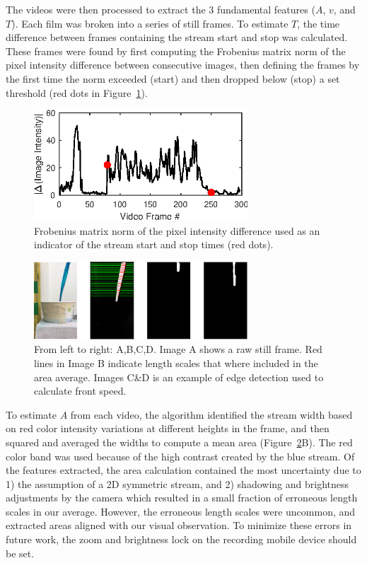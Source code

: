 \documentclass[twocolumn,10pt]{article}
\begin{document}
The videos were then processed to extract the 3 fundamental features ($A$, $v$, and $T$). Each film was broken into a series of still frames. To estimate $T$, the time difference between frames containing the stream start and stop was calculated. These frames were found by first computing the Frobenius matrix norm of the pixel intensity difference between consecutive images, then defining the frames by the first time the norm exceeded (start) and then dropped below (stop) a set threshold (red dots in Figure~\ref{fig:ImageIntensity}).

\begin{figure}
\centering
\includegraphics[width=80mm]{ImageIntensity}
\caption{Frobenius matrix norm of the pixel intensity difference used as an indicator of the stream start and stop times (red dots).}
\label{fig:ImageIntensity}
\end{figure}

\begin{figure}
\centering
\includegraphics[width=80mm]{LengthScaleExtraction}
\caption{From left to right: A,B,C,D. Image A shows a raw still frame. Red lines in Image B indicate length scales that where included in the area average. Images C\&D is an example of edge detection used to calculate front speed.}
\label{fig:lengthscale}
\end{figure}

To estimate $A$ from each video, the algorithm identified the stream width based on red color intensity variations at different heights in the frame, and then squared and averaged the widths to compute a mean area (Figure~\ref{fig:lengthscale}B). The red color band was used because of the high contrast created by the blue stream. Of the features extracted, the area calculation contained the most uncertainty due to 1) the assumption of a 2D symmetric stream, and 2) shadowing and brightness adjustments by the camera which resulted in a small fraction of erroneous length scales in our average. However, the erroneous length scales were uncommon, and extracted areas aligned with our visual observation. To minimize these errors in future work, the zoom and brightness lock on the recording mobile device should be set. 
\end{document}
